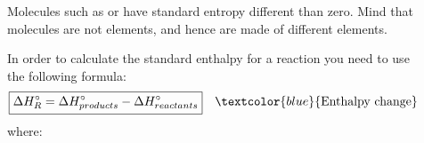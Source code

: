 \documentclass[main.tex]{subfiles}
\begin{document}
\begin{description}
\item[] 
Molecules such as  or  have standard entropy different than zero. Mind that molecules are not elements, and hence are made of different elements.
\item[] 
In order to calculate the standard enthalpy for a reaction you need to use the following formula:
\begin{equation*}\begin{split}
\boxed{  \Delta H^{\circ}_R=\Delta H^{\circ}_{products}-\Delta H^{\circ}_{reactants}  } \quad \textcolor{blue}{\text{Enthalpy change}}
\end{split}\end{equation*}
where:
 

\end{description}
\end{document}
